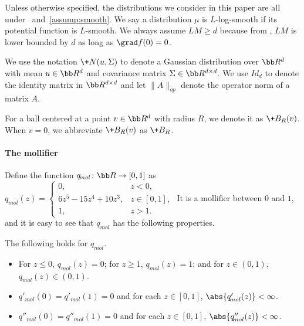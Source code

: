 \documentclass[11pt,a4paper]{article}
\begin{document}
Unless otherwise specified, the distributions we consider in this paper are all under ~and~\ref{assump:smooth}. We say a distribution $\mu$ is $L$-log-smooth if its potential function is $L$-smooth.  We always assume $LM\geq d$ because from , $LM$ is lower bounded by $d$ as long as $\grad f(0)=0$.

We use the notation $\+N(u,\Sigma)$ to denote a Gaussian distribution over $\bb R^d$ with mean $u\in \bb R^{d}$ and covariance matrix $\Sigma\in \bb R^{d\times d}$. We use $\!{Id}_d$ to denote the identity matrix in $\bb R^{d\times d}$ and let $\|A\|_{\!{op}}$ denote the operator norm of a matrix $A$.


For a ball centered at a point $v\in \bb R^d$ with radius $R$, we denote it as $\+B_R(v)$. When $v=0$, we abbreviate $\+B_R(v)$ as $\+B_R$.

 

\paragraph{The mollifier}\label{sec:mollifier}

Define the function $q_{\!{mol}}\colon \bb R\to [0,1]$ as 
$
q_{\!{mol}}(z) = 
    \begin{cases}
        0, & z<0,\\
        6z^5-15z^4+10z^3, &z\in [0,1],\\
        1, & z>1.                
    \end{cases}
$
It is a mollifier between $0$ and $1$, and it is easy to see that $q_{\!{mol}}$ has the following properties.
\begin{proposition}
    The following holds for $q_{\!mol}$.
    \begin{itemize}
        \item For $z\le 0$, $q_{\!{mol}}(z)=0$; for $z\ge 1$, $q_{\!{mol}}(z)=1$; and for $z\in (0,1)$, $q_{\!{mol}}(z)\in (0,1)$.
        \item $q'_{\!{mol}}(0)=q'_{\!{mol}}(1)=0$ and for each $z\in [0,1]$, $\abs{q'_{\!{mol}}(z)}<\infty$.
        \item $q''_{\!{mol}}(0)=q''_{\!{mol}}(1)=0$ and for each $z\in [0,1]$, $\abs{q''_{\!{mol}}(z)}<\infty$.
    \end{itemize}
\end{proposition}
\end{document}
